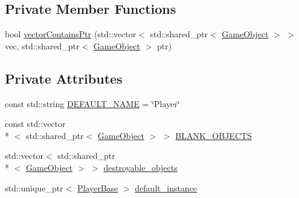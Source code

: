 \subsection*{Private Member Functions}
\begin{DoxyCompactItemize}
\item 
bool \hyperlink{classdefault__playerbase_aa4531b2048b87ed76dbac6211e6e29a3}{vector\-Contains\-Ptr} (std\-::vector$<$ std\-::shared\-\_\-ptr$<$ \hyperlink{classCourse_1_1GameObject}{Game\-Object} $>$ $>$ vec, std\-::shared\-\_\-ptr$<$ \hyperlink{classCourse_1_1GameObject}{Game\-Object} $>$ ptr)
\end{DoxyCompactItemize}
\subsection*{Private Attributes}
\begin{DoxyCompactItemize}
\item 
const std\-::string \hyperlink{classdefault__playerbase_a765fd2269477fdbc4e9089fe6c289736}{D\-E\-F\-A\-U\-L\-T\-\_\-\-N\-A\-M\-E} = \char`\"{}Player\char`\"{}
\item 
const std\-::vector\\*
$<$ std\-::shared\-\_\-ptr$<$ \hyperlink{classCourse_1_1GameObject}{Game\-Object} $>$ $>$ \hyperlink{classdefault__playerbase_a06e9be69d4ee621b71bfb2ab8b02aaa5}{B\-L\-A\-N\-K\-\_\-\-O\-B\-J\-E\-C\-T\-S}
\item 
std\-::vector$<$ std\-::shared\-\_\-ptr\\*
$<$ \hyperlink{classCourse_1_1GameObject}{Game\-Object} $>$ $>$ \hyperlink{classdefault__playerbase_a2d96091c3d07febe37760c9925ec6e1a}{destroyable\-\_\-objects}
\item 
std\-::unique\-\_\-ptr$<$ \hyperlink{classCourse_1_1PlayerBase}{Player\-Base} $>$ \hyperlink{classdefault__playerbase_a703e1d8144130378036db93a04158bf1}{default\-\_\-instance}
\end{DoxyCompactItemize}


